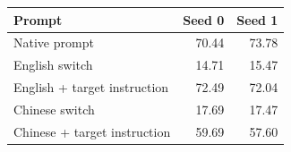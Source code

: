 \begin{tabular}{@{}lrr@{}}
\toprule
Prompt & Seed 0 & Seed 1 \\
\midrule
Native prompt & 70.44 & 73.78 \\
English switch & 14.71 & 15.47 \\
English + target instruction & 72.49 & 72.04 \\
Chinese switch & 17.69 & 17.47 \\
Chinese + target instruction & 59.69 & 57.60 \\
\bottomrule
\end{tabular}

